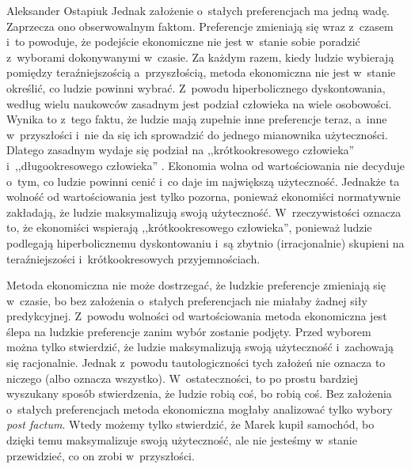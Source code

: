 \begin{artplenv}{Aleksander Ostapiuk}
Jednak założenie o~stałych preferencjach ma jedną wadę. Zaprzecza ono obserwowalnym faktom. Preferencje zmieniają się
wraz z~czasem i~to powoduje, że podejście ekonomiczne nie jest w~stanie sobie poradzić z~wyborami dokonywanymi w~czasie. Za każdym
razem, kiedy ludzie wybierają pomiędzy teraźniejszością a~przyszłością, metoda ekonomiczna nie jest w~stanie
określić, co ludzie powinni wybrać. Z~powodu hiperbolicznego dyskontowania, według wielu naukowców zasadnym jest
podział człowieka na wiele osobowości. Wynika to z~tego faktu, że ludzie mają zupełnie inne preferencje
teraz, a~inne w~przyszłości i~nie da się ich sprowadzić do jednego mianownika użyteczności.
Dlatego zasadnym wydaje się podział na
,,krótkookresowego człowieka'' i~,,długookresowego człowieka''
\parencites{ostapiuk_human_2018}[więcej na temat koncepcji wielu osobowości][]{ainslie_breakdown_2001}{cowen_self-constraint_1991}{davis_theory_2003}%
{elster_multiple_1986}{frederick_time_2002}{fudenberg_dual-self_2006}{heilmann_rationality_2010-1}%
{loewenstein_out_1996}{schelling_intimate_1980,schelling_self-command_1984,schelling_enforcing_1985,schelling_coping_1996}%
{read_which_2006}{strotz_myopia_1955}{thaler_economic_1981}.
Ekonomia wolna od wartościowania nie decyduje o~tym, co ludzie powinni cenić i~co daje im największą
użyteczność. Jednakże ta wolność od wartościowania jest tylko pozorna, ponieważ ekonomiści normatywnie zakładają, że
ludzie maksymalizują swoją użyteczność. W~rzeczywistości oznacza to, że ekonomiści wspierają ,,krótkookresowego
człowieka'', ponieważ ludzie podlegają hiperbolicznemu dyskontowaniu i~są zbytnio (irracjonalnie) skupieni na
teraźniejszości i~krótkookresowych przyjemnościach.

Metoda ekonomiczna nie może dostrzegać, że ludzkie preferencje zmieniają się w~czasie, bo bez
założenia o~stałych preferencjach nie miałaby żadnej siły predykcyjnej. Z~powodu wolności od wartościowania metoda
ekonomiczna jest ślepa na ludzkie preferencje zanim wybór zostanie podjęty. Przed wyborem można
tylko stwierdzić, że ludzie maksymalizują swoją użyteczność i~zachowają się racjonalnie. Jednak z~powodu
tautologiczności tych założeń nie oznacza to niczego (albo oznacza wszystko). W~ostateczności, to po prostu bardziej
wyszukany sposób stwierdzenia, że ludzie robią coś, bo robią coś. Bez założenia o~stałych preferencjach metoda
ekonomiczna mogłaby analizować tylko wybory \textit{post factum}. Wtedy możemy tylko stwierdzić, że Marek kupił
samochód, bo dzięki temu maksymalizuje swoją użyteczność, ale nie jesteśmy w~stanie przewidzieć, co on zrobi w~przyszłości. 


\end{artplenv}
